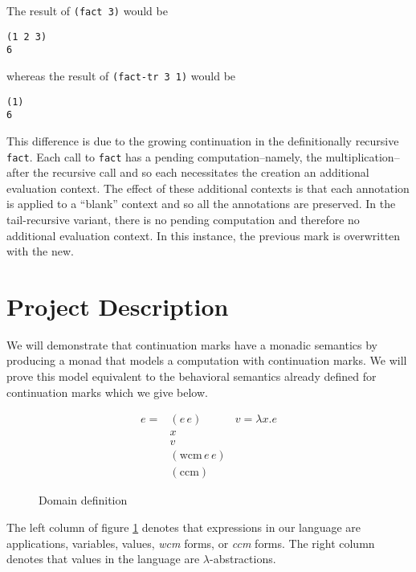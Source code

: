 \documentclass[ms]{byuprop}
\newcounter{definition}
\begin{document}
The result of \texttt{(fact 3)} would be

\begin{verbatim}
(1 2 3)
6
\end{verbatim}

whereas the result of \texttt{(fact-tr 3 1)} would be

\begin{verbatim}
(1)
6
\end{verbatim}

This difference is due to the growing continuation in the definitionally recursive
\texttt{fact}. Each call to \texttt{fact} has a pending computation--namely, the
multiplication--after the recursive call and so each necessitates the creation an
additional evaluation context. The effect of these additional contexts is that each
annotation is applied to a ``blank'' context and so all the annotations are preserved. In
the tail-recursive variant, there is no pending computation and therefore no additional
evaluation context. In this instance, the previous mark is overwritten with the new.




\section{Project Description}

We will demonstrate that continuation marks have a monadic semantics by producing a monad
that models a computation with continuation marks. We will prove  this model equivalent to
the behavioral semantics already defined for continuation marks which we give below.

\begin{figure}
\begin{align*}
e = &(e\,e) & v = \lambda x. e\\
    &x\\
    &v\\
    &(\mathrm{wcm}\,e\,e)\\
    &(\mathrm{ccm})
\end{align*}
\caption{Domain definition}
\label{domain-definition}
\end{figure}

The left column of figure \ref{domain-definition} denotes that expressions in our language
are applications, variables, values, \emph{wcm} forms, or \emph{ccm} forms. The right
column denotes that values in the language are $\lambda$-abstractions.
\end{document}
